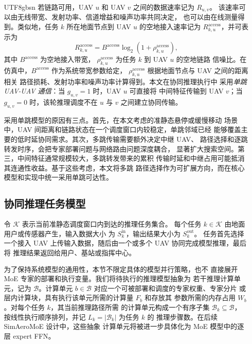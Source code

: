 \documentclass[conference]{IEEEtran}
\begin{document}
\begin{CJK*}{UTF8}{gbsn}
若链路可用，UAV $u$ 和 UAV $v$ 之间的数据速率记为 $R_{u,v}$。
该速率可以由无线带宽、发射功率、信道增益和噪声功率共同决定，
也可以由在线测量得到。类似地，任务 $k$ 所在地面节点到 UAV $u$
的空地接入速率记为 $R_{k,u}^{\mathrm{access}}$，并可表示为
\begin{equation}
R_{k,u}^{\mathrm{access}}
= B^{\mathrm{access}}
\log_2\left(1+\rho_{k,u}^{\mathrm{access}}\right),
\end{equation}
其中 $B^{\mathrm{access}}$ 为空地接入带宽，
$\rho_{k,u}^{\mathrm{access}}$ 为任务 $k$ 到 UAV $u$ 的空地链路
信噪比。在仿真中，$B^{\mathrm{access}}$ 作为系统带宽参数给定，
$\rho_{k,u}^{\mathrm{access}}$ 根据地面节点与 UAV 之间的距离相关
路径损耗、发射功率和噪声功率计算得到。本文在协同推理执行中
采用\emph{单跳 UAV-UAV 通信}：当 $g_{u,v}=1$ 时，UAV $u$ 可直接将
中间特征传输到 UAV $v$；当 $g_{u,v}=0$ 时，该轮推理调度不在 $u$ 与
$v$ 之间建立协同传输。

采用单跳模型的原因有三点。首先，在本文考虑的准静态悬停或缓慢移动
场景中，UAV 间距离和链路状态在一个调度窗口内较稳定，单跳邻域已经
能够覆盖主要的低时延协同需求。其次，多跳传输需要额外决定中继 UAV、
路径选择和逐跳转发时序，会把专家部署问题与网络路由问题深度耦合，
显著扩大搜索空间。第三，中间特征通常规模较大，多跳转发带来的累积
传输时延和中继占用可能抵消其连通性收益。基于这些考虑，本文将多跳
路径选择作为可扩展方向，而在核心模型和实现中统一采用单跳可达性。

\subsection{协同推理任务模型}

令 $\mathcal{K}$ 表示当前准静态调度窗口内到达的推理任务集合。
每个任务 $k\in\mathcal{K}$ 由地面用户或传感器产生，输入数据大小
为 $S_k^{\mathrm{in}}$，输出结果大小为 $S_k^{\mathrm{out}}$。
任务首先选择一个接入 UAV
上传输入数据，随后由一个或多个 UAV 协同完成模型推理，最后将
推理结果返回给用户、基站或指挥中心。

为了保持系统模型的通用性，本节不限定具体的模型并行策略，也不
直接展开 MoE 专家的部署和执行变量。我们将待执行的推理模型抽象为
若干推理计算单元，记为 $\mathcal{B}$。计算单元
$b\in\mathcal{B}$ 对应一个可被部署和调度的专家权重、专家分片
或层内计算块，具有执行该单元所需的计算量 $F_b$ 和存放其
参数所需的内存占用 $W_b$。对每个任务 $k$，其当前推理路径所需
的计算单元构成一个有序子集 $\mathcal{B}_k\subseteq\mathcal{B}$，
按线性执行顺序排列，并记 $L_k=|\mathcal{B}_k|$ 为任务 $k$ 的
推理步骤数。在后续 SimAeroMoE 设计中，这些抽象
计算单元将被进一步具体化为 MoE 模型中的逐层 expert FFN。


\end{CJK*}
\end{document}
